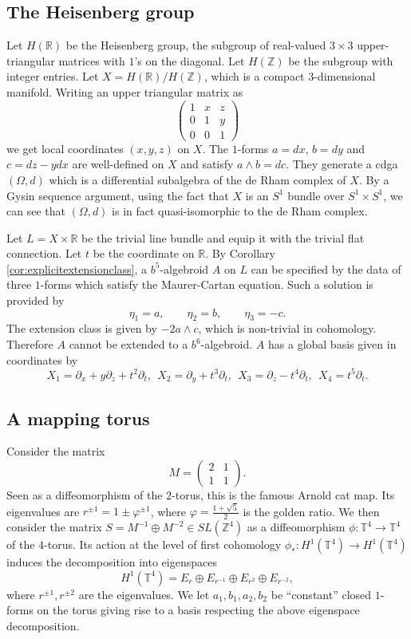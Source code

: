 \documentclass[10pt]{amsart}
\newcommand{\RR}{\mathbb{R}}
\newcommand{\TT}{\mathbb{T}}
\newcommand{\ZZ}{\mathbb{Z}}
\numberwithin{theoremalpha}{section}
\numberwithin{equation}{section}
\numberwithin{definition}{section}
\numberwithin{theorem}{section}
\numberwithin{proposition}{section}
\numberwithin{lemma}{section}
\numberwithin{example}{section}
\numberwithin{remark}{section}
\numberwithin{corollary}{section}
\numberwithin{question}{section}
\numberwithin{problem}{section}
\numberwithin{assumption}{section}
\theoremstyle{named}
\numberwithin{equation}{section}
\begin{document}
\subsection{The Heisenberg group}\label{ex:Heisenberg1}

Let $H(\RR)$ be the Heisenberg group, the subgroup of real-valued $3 \times 3$ upper-triangular matrices with $1$'s on the diagonal. Let $H(\ZZ)$ be the subgroup with integer entries. Let $X = H(\RR)/H(\ZZ)$, which is a compact $3$-dimensional manifold. Writing an upper triangular matrix as 
\[ \begin{pmatrix} 1 & x & z \\ 0 & 1 & y \\ 0 & 0 & 1 \end{pmatrix} \]
we get local coordinates $(x,y,z)$ on $X$. The $1$-forms $a = dx$, $b = dy$ and $c=dz-ydx$ are well-defined on $X$ and satisfy $a \wedge b = dc$. They generate a cdga $(\Omega, d)$ which is a differential subalgebra of the de Rham complex of $X$. By a Gysin sequence argument, using the fact that $X$ is an $S^1$ bundle over $S^1 \times S^1$, we can see that $(\Omega, d)$ is in fact quasi-isomorphic to the de Rham complex. 

Let $L = X \times \RR$ be the trivial line bundle and equip it with the trivial flat connection. Let $t$ be the coordinate on $\mathbb{R}$. By Corollary \ref{cor:explicitextensionclass}, a $b^{5}$-algebroid $A$ on $L$ can be specified by the data of three $1$-forms which satisfy the Maurer-Cartan equation. Such a solution is provided by 
\[ \eta_{1} = a, \qquad \eta_{2} = b, \qquad \eta_{3} = -c. \]
The extension class is given by $-2 a \wedge c$, which is non-trivial in cohomology. Therefore $A$ cannot be extended to a $b^{6}$-algebroid. $A$ has a global basis given in coordinates by 
\[ X_{1} = \partial_{x} + y \partial_{z} + t^2 \partial_{t}, \ \ X_{2} = \partial_{y} + t^3 \partial_{t}, \ \ X_{3} = \partial_{z} - t^4 \partial_{t}, \ \ X_{4} = t^{5} \partial_{t}. \]

 
\subsection{A mapping torus}

Consider the matrix 
\[ M = \begin{pmatrix} 2 & 1 \\ 1 & 1 \end{pmatrix}. \]
Seen as a diffeomorphism of the $2$-torus, this is the famous Arnold cat map. Its eigenvalues are $r^{\pm 1} = 1 \pm \varphi^{\pm 1}$, where $\varphi = \frac{1 + \sqrt{5}}{2}$ is the golden ratio. We then consider the matrix $S = M^{-1} \oplus M^{-2} \in SL(\ZZ^4)$ as a diffeomorphism $\phi : \TT^4 \to \TT^4$ of the $4$-torus. Its action at the level of first cohomology $\phi_{*} : H^{1}(\TT^4) \to H^{1}(\TT^4) $ induces the decomposition into eigenspaces 
\[ H^{1}(\mathbb{T}^4) = E_{r} \oplus E_{r^{-1}} \oplus E_{r^2} \oplus E_{r^{-2}}, \]
where $r^{\pm 1}, r^{\pm 2}$ are the eigenvalues. We let $a_{1}, b_{1}, a_{2}, b_{2}$ be ``constant'' closed $1$-forms on the torus giving rise to a basis respecting the above eigenspace decomposition. 
\end{document}
